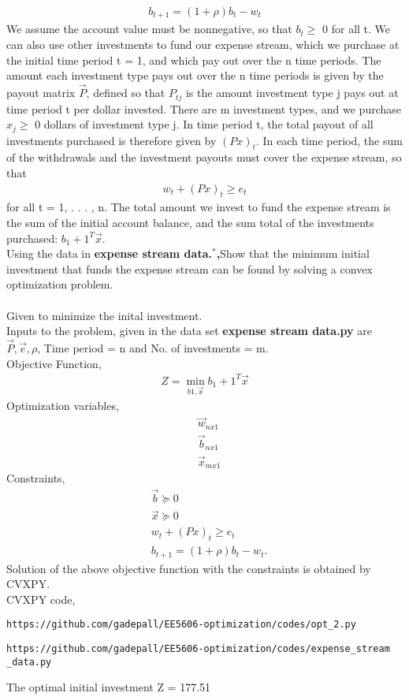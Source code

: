 \documentclass[journal,12pt,twocolumn]{IEEEtran}
\begin{document}
\begin{enumerate}
\begin{align}
b_{t+1} = (1+ \rho)b_t - w_t \nonumber
\end{align}
We assume the account value must be nonnegative, so that $b_t \geq$ 0 for all t.
We can also use other investments to fund our expense stream, which we purchase at
the initial time period t = 1, and which pay out over the n time periods. The amount
each investment type pays out over the n time periods is given by the payout matrix
$\vec{P}$, defined so that $P_{tj}$ is the amount investment type j pays out at time period t per
dollar invested. There are m investment types, and we purchase $x_j \geq$ 0 dollars of
investment type j. In time period t, the total payout of all investments purchased is
therefore given by $({P x})_{t}$.
In each time period, the sum of the withdrawals and the investment payouts must
cover the expense stream, so that
\begin{align}
w_t + ({P x})_t \geq e_t \nonumber
\end{align}
for all t = 1, . . . , n.
The total amount we invest to fund the expense stream is the sum of the initial account
balance, and the sum total of the investments purchased: $b_1 + 1^T \vec{x}$.\\
Using the data in \textbf{expense stream data.$^*$,}Show that the minimum initial investment that funds the expense stream can be
found by solving a convex optimization problem.\\
\solution\\
Given to minimize the inital investment.\\
Inputs to the problem, given in the data set \textbf{expense stream data.py} are $\vec{P}, \vec{e}, \rho$, Time period = n and No. of investments = m.\\
Objective Function,
\begin{align}
Z = \min_{b1,\vec{x}} b_1 + 1^T \vec{x}
\end{align}
Optimization variables,
\begin{align}
&\vec{w}_{n x 1} \\
& \vec{b}_{n x 1}  \\ &\vec{x}_{m x 1} 
\end{align}
Constraints,
\begin{align}
&\vec{b} \succeq 0   \\
&\vec{x} \succeq 0 \\
&w_t + ({P x})_t \geq e_t  \\
&b_{t+1} = (1+ \rho)b_t - w_t .
\end{align}
Solution of the above objective function with the constraints is obtained by CVXPY.\\
CVXPY code, 
\begin{lstlisting}
https://github.com/gadepall/EE5606-optimization/codes/opt_2.py
\end{lstlisting}
\begin{lstlisting}
https://github.com/gadepall/EE5606-optimization/codes/expense_stream _data.py
\end{lstlisting}
The optimal initial investment Z = 177.51

\end{enumerate}
\end{document}
